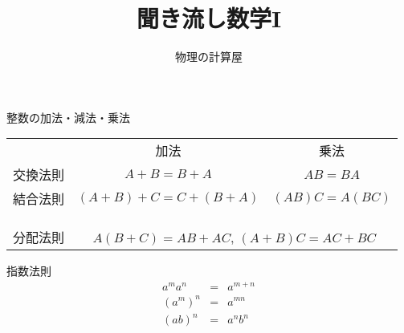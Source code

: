 \documentclass[aspectratio=169, 12pt]{beamer} %
\begin{document}
\title{聞き流し数学I}
\author[物理の計算屋]{物理の計算屋}
\date{}
\frame{\maketitle} %
\begin{frame}{整数の加法・減法・乗法}
    \begin{table}[h]
        \centering
        \begin{tabular}{ccc}
                 & 加法                                                 & 乗法              \\
            交換法則 & $ A+B=B+A $                                        & $ AB=BA $       \\
            結合法則 & $ (A+B)+C=C+(B+A) $                                & $ (AB)C=A(BC) $ \\
                 &                                                    &                 \\
            \\
            \\
            分配法則 & \multicolumn{2}{c}{$A(B+C)=AB+AC$, $(A+B)C=AC+BC$}                   \\
        \end{tabular}
    \end{table}
\end{frame}

\begin{frame}{指数法則}
    \begin{eqnarray*}
        a^ma^n&=&a^{m+n} \\
        (a^m)^n&=&a^{mn} \\
        (ab)^n&=&a^nb^n
    \end{eqnarray*}
\end{frame}
\end{document}
